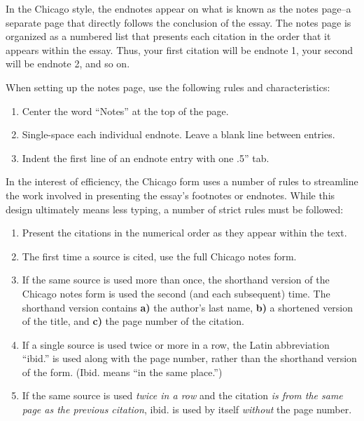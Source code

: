 \documentclass[12pt, hidelinks]{article} %
\begin{document}
In the Chicago style, the endnotes appear on what is known as the notes page--a separate page that directly follows the conclusion of the essay. The notes page is organized as a numbered list that presents each citation in the order that it appears within the essay. Thus, your first citation will be endnote 1, your second will be endnote 2, and so on.

When setting up the notes page, use the following rules and characteristics:

\begin{enumerate}
\item Center the word ``Notes'' at the top of the page.
\item Single-space each individual endnote. Leave a blank line between entries.
\item Indent the first line of an endnote entry with one .5'' tab.
\end{enumerate}

In the interest of efficiency, the Chicago form uses a number of rules to streamline the work involved in presenting the essay's footnotes or endnotes. While this design ultimately means less typing, a number of strict rules must be followed:

\begin{enumerate}
\item Present the citations in the numerical order as they appear within the text.

\item The first time a source is cited, use the full Chicago notes form.

\item If the same source is used more than once, the shorthand version of the Chicago notes form is used the second (and each subsequent) time. The shorthand version contains \textbf{a)} the author's last name, \textbf{b)} a shortened version of the title, and \textbf{c)} the page number of the citation.

\item If a single source is used twice or more in a row, the Latin abbreviation ``ibid.'' is used along with the page number, rather than the shorthand version of the form. (Ibid. means ``in the same place.'')

\item If the same source is used \emph{twice in a row} and the citation \emph{is from the same page as the previous citation}, ibid. is used by itself \emph{without} the page number. 
\end{enumerate}
\end{document}
